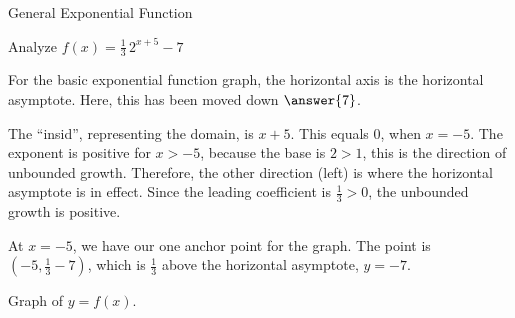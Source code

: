 \documentclass{ximera}
\begin{document}
\begin{example}  General Exponential Function



Analyze   $f(x) = \frac{1}{3} \, 2^{x+5} - 7$ \\


\begin{explanation}

For the basic exponential function graph, the horizontal axis is the horizontal asymptote.  Here, this has been moved down $\answer{7}$.



The ``insid'', representing the domain, is $x+5$.  This equals $0$, when $x=-5$.  The exponent is positive for $x>-5$, because the base is $2 > 1$, this is the direction of unbounded growth.  Therefore, the other direction (left) is where the horizontal asymptote is in effect.  Since the leading coefficient is $\frac{1}{3} > 0$, the unbounded growth is positive.

At $x=-5$, we have our one anchor point for the graph.  The point is $\left(-5, \frac{1}{3} - 7 \right)$, which is $\frac{1}{3}$ above the horizontal asymptote, $y = -7$.


Graph of $y = f(x)$.

\begin{image}
\end{image}





\end{explanation}
\end{example}
\end{document}
